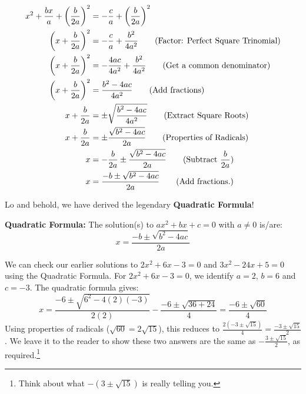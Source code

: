 \begin{align*}
x^2 + \dfrac{bx}{a} + \left(\dfrac{b}{2a}\right)^2 & = -\dfrac{c}{a} + \left(\dfrac{b}{2a}\right)^2 \\
\left(x + \dfrac{b}{2a}\right)^2 & = -\dfrac{c}{a} + \dfrac{b^2}{4a^2} \tag{Factor: Perfect Square Trinomial} \\
\left(x + \dfrac{b}{2a}\right)^2 & = -\dfrac{4ac}{4a^2} + \dfrac{b^2}{4a^2} \tag{Get a common denominator}\\
\left(x + \dfrac{b}{2a}\right)^2 & = \dfrac{b^2 - 4ac}{4a^2} \tag{Add fractions}\\
x + \dfrac{b}{2a} & = \pm \sqrt{\dfrac{b^2 - 4ac}{4a^2}} \tag{Extract Square Roots} \\
x + \dfrac{b}{2a} & = \pm \dfrac{\sqrt{b^2 - 4ac}}{2a} \tag{Properties of Radicals} \\
x  & = - \dfrac{b}{2a} \pm \dfrac{\sqrt{b^2 - 4ac}}{2a} \tag{Subtract $\dfrac{b}{2a}$} \\ 
x  & = \dfrac{-b \pm \sqrt{b^2 - 4ac}}{2a} \tag{Add fractions.} \\
\end{align*}

Lo and behold, we have derived the legendary \textbf{Quadratic Formula}!

\begin{tcolorbox}
    
\begin{thm}\label{quadraticformula}  \textbf{Quadratic Formula:} The solution(s) to $ax^2 + bx + c = 0$ with $a \neq 0$ is/are: \[x  = \dfrac{-b \pm \sqrt{b^2 - 4ac}}{2a} \]

\end{thm}

\end{tcolorbox}

We can check our earlier solutions to $2x^2 + 6x - 3 = 0$ and $3x^2 - 24x + 5 = 0$ using the Quadratic Formula.  For $2x^2 + 6x - 3 = 0$, we identify $a = 2$, $b = 6$ and $c = -3$.  The quadratic formula gives: \[ x = \dfrac{-6 \pm \sqrt{6^2 - 4(2)(-3)}}{2(2)} - \dfrac{-6 \pm \sqrt{36 + 24}}{4} = \dfrac{-6 \pm \sqrt{60}}{4} \] Using properties of radicals ($\sqrt{60} = 2 \sqrt{15}$), this reduces to $\frac{2(-3 \pm \sqrt{15})}{4} =\frac{-3 \pm \sqrt{15}}{2}$. We leave it to the reader to show these two answers are the same as $-\frac{3 \pm \sqrt{15}}{2}$,  as required.\footnote{Think about what $-(3 \pm \sqrt{15})$ is really telling you.}  

